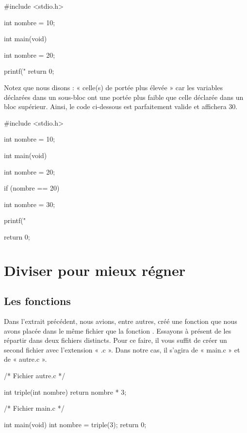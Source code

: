 \begin{C}
#include <stdio.h>

int nombre = 10;

int main(void)
{
    int nombre = 20;

    printf("%
    return 0;
}
\end{C}

Notez que nous disons : « celle(s) de portée plus élevée » car les
variables déclarées dans un sous-bloc ont une portée plus faible que
celle déclarée dans un bloc supérieur. Ainsi, le code ci-dessous est
parfaitement valide et affichera 30.

\begin{C}
 #include <stdio.h>

int nombre = 10;

int main(void)
{
    int nombre = 20;

    if (nombre == 20)
    {
        int nombre = 30;

        printf("%
    }

    return 0;
}
\end{C}



\section{Diviser pour mieux régner }
\label{diviser-pour-mieux-régner }

\subsection{Les fonctions}
\label{les-fonctions-1}

Dans l'extrait précédent, nous avions, entre autres, créé une fonction
 que nous avons placée dans le même fichier que la
fonction . Essayons à présent de les répartir dans deux
fichiers distincts. Pour ce faire, il vous suffit de créer un second
fichier avec l'extension « .c ». Dans notre cas, il s'agira de « main.c
» et de « autre.c ».

\begin{C}
/* Fichier autre.c */

int triple(int nombre)
{
    return nombre * 3;
}

\end{C}

\begin{C}
/* Fichier main.c */

int main(void)
{
    int nombre = triple(3);
    return 0;
}
\end{C}


